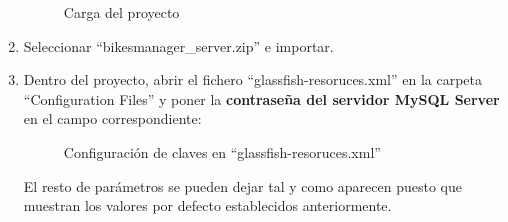 \begin{enumerate}
\begin{figure} [!htb]
		\centering
		\caption{Carga del proyecto}
		\label{fig:server_6}
	\end{figure}
	\FloatBarrier
	\item Seleccionar ``bikesmanager\_server.zip'' e importar.
	\item Dentro del proyecto, abrir el fichero ``glassfish-resoruces.xml'' en la carpeta ``Configuration Files'' y poner la \textbf{contraseña del servidor MySQL Server} en el campo correspondiente:
	\begin{figure} [!htb]
		\centering
		\caption{Configuración de claves en ``glassfish-resoruces.xml''}
		\label{fig:server_7}
	\end{figure}
	\FloatBarrier	
	El resto de parámetros se pueden dejar tal y como aparecen puesto que muestran los valores por defecto establecidos anteriormente.

\end{enumerate}
